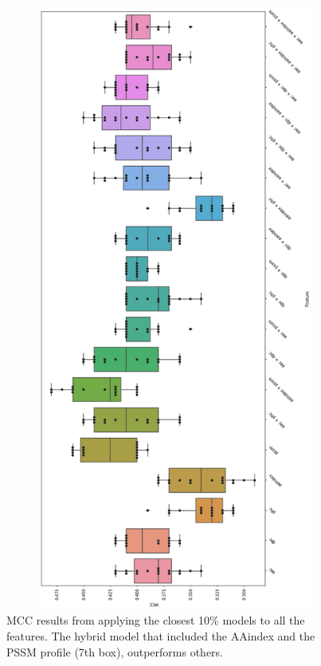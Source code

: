 \begin{figure}[ht]
  \begin{adjustwidth}{-2.25in}{0in}
    \centering
    \includegraphics[width=13cm,height=20cm]{figures/15MccAllModels.png}
    \captionsetup{font=footnotesize,width=12cm, justification=centering}
    \caption{MCC results from applying the closest 10\% models to all the features.
    The hybrid model that included the AAindex and the PSSM profile (7th box), outperforms others.}
    \label{fig:MccAllModels}
  \end{adjustwidth}
\end{figure}
